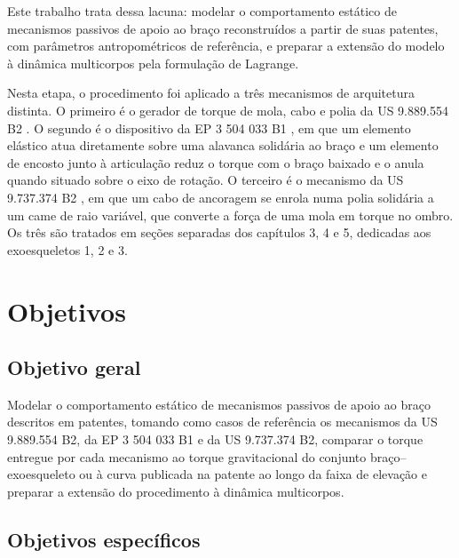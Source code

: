 Este trabalho trata dessa lacuna: modelar o comportamento estático de mecanismos passivos de apoio ao braço reconstruídos a partir de suas patentes, com parâmetros antropométricos de referência, e preparar a extensão do modelo à dinâmica multicorpos pela formulação de Lagrange.

Nesta etapa, o procedimento foi aplicado a três mecanismos de arquitetura distinta. O primeiro é o gerador de torque de mola, cabo e polia da US 9.889.554 B2 \cite{vanengelhoven2018}. O segundo é o dispositivo da EP 3 504 033 B1 \cite{mizera2023}, em que um elemento elástico atua diretamente sobre uma alavanca solidária ao braço e um elemento de encosto junto à articulação reduz o torque com o braço baixado e o anula quando situado sobre o eixo de rotação. O terceiro é o mecanismo da US 9.737.374 B2 \cite{doyle2017}, em que um cabo de ancoragem se enrola numa polia solidária a um came de raio variável, que converte a força de uma mola em torque no ombro. Os três são tratados em seções separadas dos capítulos 3, 4 e 5, dedicadas aos exoesqueletos 1, 2 e 3.

\section{Objetivos}\label{sec:1.1}

\subsection{Objetivo geral}\label{sec:1.1.1}

Modelar o comportamento estático de mecanismos passivos de apoio ao braço descritos em patentes, tomando como casos de referência os mecanismos da US 9.889.554 B2, da EP 3 504 033 B1 e da US 9.737.374 B2, comparar o torque entregue por cada mecanismo ao torque gravitacional do conjunto braço–exoesqueleto ou à curva publicada na patente ao longo da faixa de elevação e preparar a extensão do procedimento à dinâmica multicorpos.

\subsection{Objetivos específicos}\label{sec:1.1.2}

